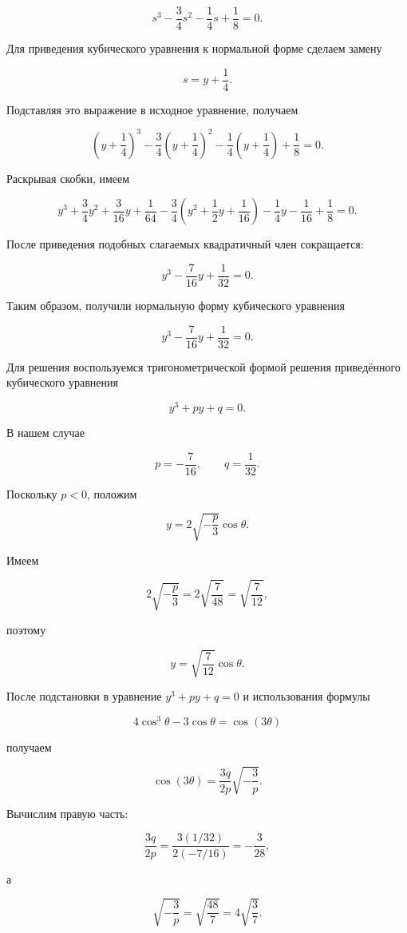 \documentclass[12pt,a4paper]{article}
\begin{document}
	$$
	s^3-\frac34s^2-\frac14s+\frac18=0.
	$$
	
	Для приведения кубического уравнения к нормальной форме сделаем замену
	
	$$
	s=y+\frac14.
	$$
	
	Подставляя это выражение в исходное уравнение, получаем
	
	$$
	\left(y+\frac14\right)^3
	-\frac34\left(y+\frac14\right)^2
	-\frac14\left(y+\frac14\right)
	+\frac18=0.
	$$
	
	Раскрывая скобки, имеем
	
	$$
	y^3+\frac34y^2+\frac3{16}y+\frac1{64}
	-\frac34\left(y^2+\frac12y+\frac1{16}\right)
	-\frac14y-\frac1{16}
	+\frac18=0.
	$$
	
	После приведения подобных слагаемых квадратичный член сокращается:
	
	$$
	y^3-\frac7{16}y+\frac1{32}=0.
	$$
	
	Таким образом, получили нормальную форму кубического уравнения
	
	$$
	\boxed{
		y^3-\frac7{16}y+\frac1{32}=0.
	}
	$$
	
	Для решения воспользуемся тригонометрической формой решения приведённого кубического уравнения
	
	$$
	y^3+py+q=0.
	$$
	
	В нашем случае
	
	$$
	p=-\frac7{16},
	\qquad
	q=\frac1{32}.
	$$
	
	Поскольку $p<0$, положим
	
	$$
	y=2\sqrt{-\frac p3}\cos\theta.
	$$
	
	Имеем
	
	$$
	2\sqrt{-\frac p3}
	=
	2\sqrt{\frac7{48}}
	=
	\sqrt{\frac7{12}},
	$$
	
	поэтому
	
	$$
	y=\sqrt{\frac7{12}}\cos\theta.
	$$
	
	После подстановки в уравнение $y^3+py+q=0$ и использования формулы
	
	$$
	4\cos^3\theta-3\cos\theta=\cos(3\theta)
	$$
	
	получаем
	
	$$
	\cos(3\theta)
	=
	\frac{3q}{2p}\sqrt{-\frac3p}.
	$$
	
	Вычислим правую часть:
	
	$$
	\frac{3q}{2p}
	=
	\frac{3(1/32)}
	{2(-7/16)}
	=
	-\frac3{28},
	$$
	
	а
	
	$$
	\sqrt{-\frac3p}
	=
	\sqrt{\frac{48}{7}}
	=
	4\sqrt{\frac37}.
	$$
	
\end{document}

